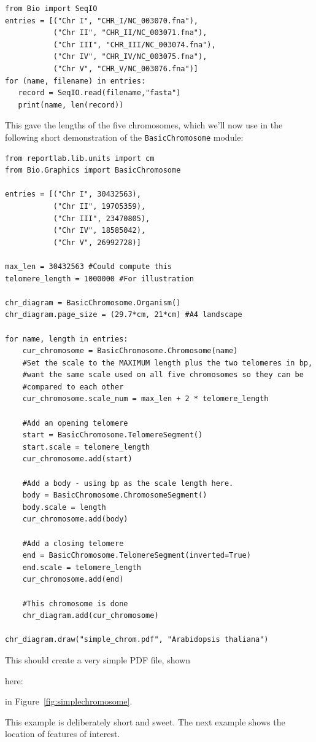 \documentclass{report}
\begin{document}
\begin{verbatim}
from Bio import SeqIO
entries = [("Chr I", "CHR_I/NC_003070.fna"),
           ("Chr II", "CHR_II/NC_003071.fna"),
           ("Chr III", "CHR_III/NC_003074.fna"),
           ("Chr IV", "CHR_IV/NC_003075.fna"),
           ("Chr V", "CHR_V/NC_003076.fna")]
for (name, filename) in entries:
   record = SeqIO.read(filename,"fasta")
   print(name, len(record))
\end{verbatim}

\noindent This gave the lengths of the five chromosomes, which we'll now use in
the following short demonstration of the \verb|BasicChromosome| module:

\begin{verbatim}
from reportlab.lib.units import cm
from Bio.Graphics import BasicChromosome

entries = [("Chr I", 30432563),
           ("Chr II", 19705359),
           ("Chr III", 23470805),
           ("Chr IV", 18585042),
           ("Chr V", 26992728)]

max_len = 30432563 #Could compute this
telomere_length = 1000000 #For illustration
         
chr_diagram = BasicChromosome.Organism()
chr_diagram.page_size = (29.7*cm, 21*cm) #A4 landscape

for name, length in entries:
    cur_chromosome = BasicChromosome.Chromosome(name)
    #Set the scale to the MAXIMUM length plus the two telomeres in bp,
    #want the same scale used on all five chromosomes so they can be
    #compared to each other
    cur_chromosome.scale_num = max_len + 2 * telomere_length

    #Add an opening telomere
    start = BasicChromosome.TelomereSegment()
    start.scale = telomere_length
    cur_chromosome.add(start)

    #Add a body - using bp as the scale length here.
    body = BasicChromosome.ChromosomeSegment()
    body.scale = length
    cur_chromosome.add(body)

    #Add a closing telomere
    end = BasicChromosome.TelomereSegment(inverted=True)
    end.scale = telomere_length
    cur_chromosome.add(end)

    #This chromosome is done
    chr_diagram.add(cur_chromosome)

chr_diagram.draw("simple_chrom.pdf", "Arabidopsis thaliana")
\end{verbatim}

This should create a very simple PDF file, shown
\begin{htmlonly}
here:


\end{htmlonly}
\begin{latexonly}
in Figure~\ref{fig:simplechromosome}.
\end{latexonly}
This example is deliberately short and sweet. The next example shows the
location of features of interest.
\end{document}
